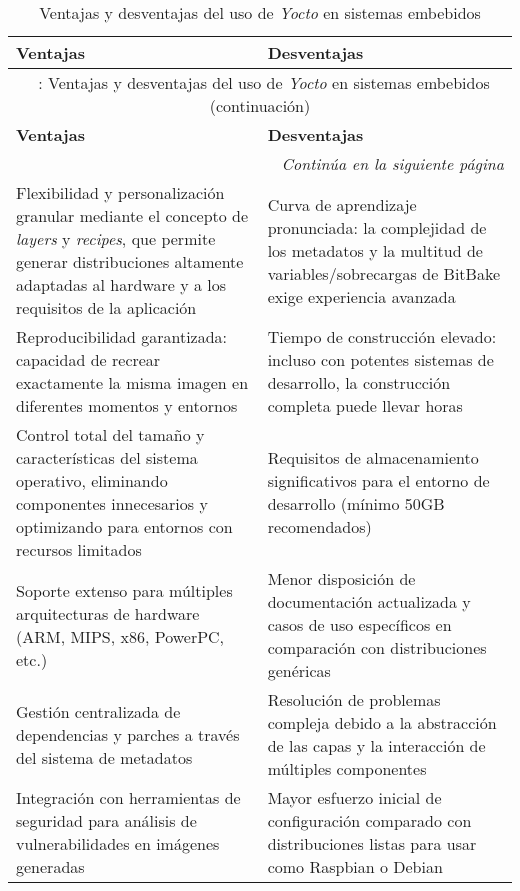 \begin{longtable}{p{7.5cm}|p{7.5cm}}
    \caption{Ventajas y desventajas del uso de \textit{Yocto} en sistemas embebidos} \label{tab:yocto_pros_cons} \\
    \hline
    \textbf{Ventajas} & \textbf{Desventajas} \\
    \hline
    \endfirsthead
    
    \multicolumn{2}{c}{\tablename\ \thetable{}: Ventajas y desventajas del uso de \textit{Yocto} en sistemas embebidos (continuación)} \\
    \hline
    \textbf{Ventajas} & \textbf{Desventajas} \\
    \hline
    \endhead
    
    \hline
    \multicolumn{2}{r}{\textit{Continúa en la siguiente página}} \\
    \endfoot
    
    \hline
    \endlastfoot
    
    Flexibilidad y personalización granular mediante el concepto de \textit{layers} y \textit{recipes}, que permite generar distribuciones altamente adaptadas al hardware y a los requisitos de la aplicación & Curva de aprendizaje pronunciada: la complejidad de los metadatos y la multitud de variables/sobrecargas de BitBake exige experiencia avanzada \\
    \hline
    
    Reproducibilidad garantizada: capacidad de recrear exactamente la misma imagen en diferentes momentos y entornos & Tiempo de construcción elevado: incluso con potentes sistemas de desarrollo, la construcción completa puede llevar horas \\
    \hline
    
    Control total del tamaño y características del sistema operativo, eliminando componentes innecesarios y optimizando para entornos con recursos limitados & Requisitos de almacenamiento significativos para el entorno de desarrollo (mínimo 50GB recomendados) \\
    \hline
    
    Soporte extenso para múltiples arquitecturas de hardware (ARM, MIPS, x86, PowerPC, etc.) & Menor disposición de documentación actualizada y casos de uso específicos en comparación con distribuciones genéricas \\
    \hline
    
    Gestión centralizada de dependencias y parches a través del sistema de metadatos & Resolución de problemas compleja debido a la abstracción de las capas y la interacción de múltiples componentes \\
    \hline
    
    Integración con herramientas de seguridad para análisis de vulnerabilidades en imágenes generadas & Mayor esfuerzo inicial de configuración comparado con distribuciones listas para usar como Raspbian o Debian \\
\end{longtable}
